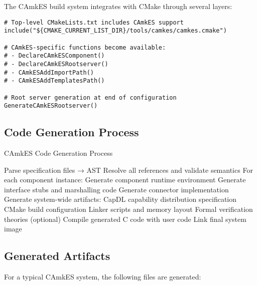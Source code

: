 \documentclass[12pt,a4paper]{article}
\begin{document}
The CAmkES build system integrates with CMake through several layers:


\begin{lstlisting}[style=camkes]
# Top-level CMakeLists.txt includes CAmkES support
include("${CMAKE_CURRENT_LIST_DIR}/tools/camkes/camkes.cmake")

# CAmkES-specific functions become available:
# - DeclareCAmkESComponent()
# - DeclareCAmkESRootserver() 
# - CAmkESAddImportPath()
# - CAmkESAddTemplatesPath()

# Root server generation at end of configuration
GenerateCAmkESRootserver()
\end{lstlisting}

\subsection{Code Generation Process}

\begin{algorithm}
\caption{CAmkES Code Generation Process}
\begin{algorithmic}[1]
\STATE Parse specification files → AST
\STATE Resolve all references and validate semantics
\STATE For each component instance:
\STATE \hspace{0.5cm} Generate component runtime environment
\STATE \hspace{0.5cm} Generate interface stubs and marshalling code
\STATE \hspace{0.5cm} Generate connector implementation
\STATE Generate system-wide artifacts:
\STATE \hspace{0.5cm} CapDL capability distribution specification
\STATE \hspace{0.5cm} CMake build configuration
\STATE \hspace{0.5cm} Linker scripts and memory layout
\STATE \hspace{0.5cm} Formal verification theories (optional)
\STATE Compile generated C code with user code
\STATE Link final system image
\end{algorithmic}
\end{algorithm}

\subsection{Generated Artifacts}

For a typical CAmkES system, the following files are generated:
\end{document}
